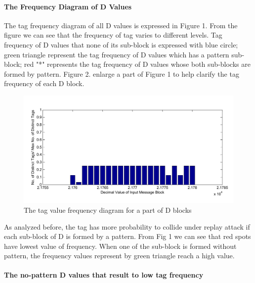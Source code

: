 \documentclass{article}
\begin{document}
\paragraph{The Frequency Diagram of D Values}
The tag frequency diagram of all D values is expressed in Figure 1. From the figure we can see that the frequency of tag varies to different levels. Tag frequency of D values that none of its sub-block is expressed with blue circle; green triangle represent the tag frequency of D values which has a pattern sub-block; red "*" represents the tag frequency of D values whose both sub-blocks are formed by pattern. 
Figure 2. enlarge a part of Figure 1 to help clarify the tag frequency of each D block. 
\begin{figure}[htbp]
 \centering
 \includegraphics[scale=0.4]{./frequency/portion_bar.pdf}
 \caption{The tag value frequency diagram for a part of D blocks}
 \label{frequency_hist }
\end{figure} 
As analyzed before, the tag has more probability to collide under replay attack if each sub-block of D is formed by a pattern. From Fig 1 we can see that red spots have lowest value of frequency. When one of the sub-block is formed without pattern, the frequency values represent by green triangle reach a high value.

\paragraph{The no-pattern D values that result to low tag frequency}
 
\end{document}

